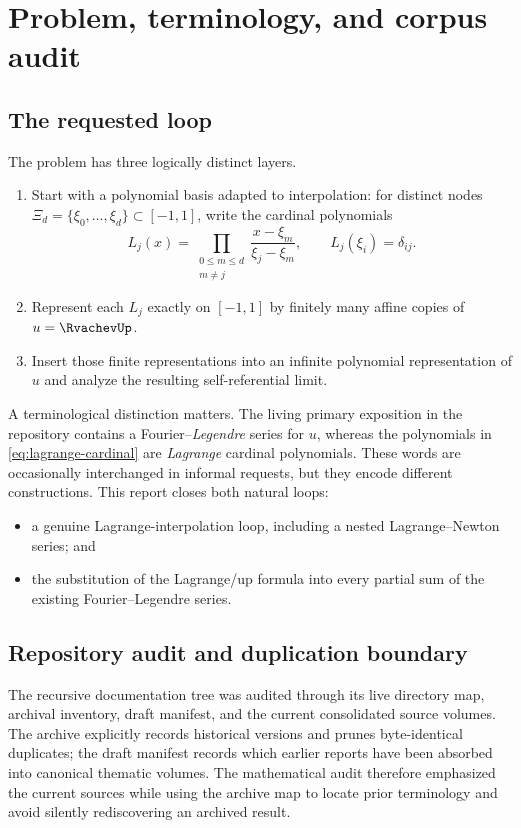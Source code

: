 \documentclass[11pt,oneside]{article}
\theoremstyle{definition}
\theoremstyle{remark}
\begin{document}
\tableofcontents
\newpage

\section{Problem, terminology, and corpus audit}

\subsection{The requested loop}
The problem has three logically distinct layers.

\begin{enumerate}
\item Start with a polynomial basis adapted to interpolation: for distinct
nodes $\Xi_d=\{\xi_0,\ldots,\xi_d\}\subset[-1,1]$, write the cardinal
polynomials
\begin{equation}
 L_j(x)=\prod_{\substack{0\le m\le d\\m\ne j}}
 \frac{x-\xi_m}{\xi_j-\xi_m},
 \qquad L_j(\xi_i)=\delta_{ij}.
 \label{eq:lagrange-cardinal}
\end{equation}
\item Represent each $L_j$ exactly on $[-1,1]$ by finitely many affine
copies of $u=\RvachevUp$.
\item Insert those finite representations into an infinite polynomial
representation of $u$ and analyze the resulting self-referential limit.
\end{enumerate}

A terminological distinction matters.  The living primary exposition in the
repository contains a Fourier--\emph{Legendre} series for $u$, whereas the
polynomials in \eqref{eq:lagrange-cardinal} are \emph{Lagrange} cardinal
polynomials.  These words are occasionally interchanged in informal
requests, but they encode different constructions.  This report closes both
natural loops:

\begin{itemize}
\item a genuine Lagrange-interpolation loop, including a nested
Lagrange--Newton series; and
\item the substitution of the Lagrange/up formula into every partial sum of
the existing Fourier--Legendre series.
\end{itemize}

\subsection{Repository audit and duplication boundary}
The recursive documentation tree was audited through its live directory
map, archival inventory, draft manifest, and the current consolidated source
volumes.  The archive explicitly records historical versions and prunes
byte-identical duplicates; the draft manifest records which earlier reports
have been absorbed into canonical thematic volumes.  The mathematical audit
therefore emphasized the current sources while using the archive map to
locate prior terminology and avoid silently rediscovering an archived
result.
\end{document}
